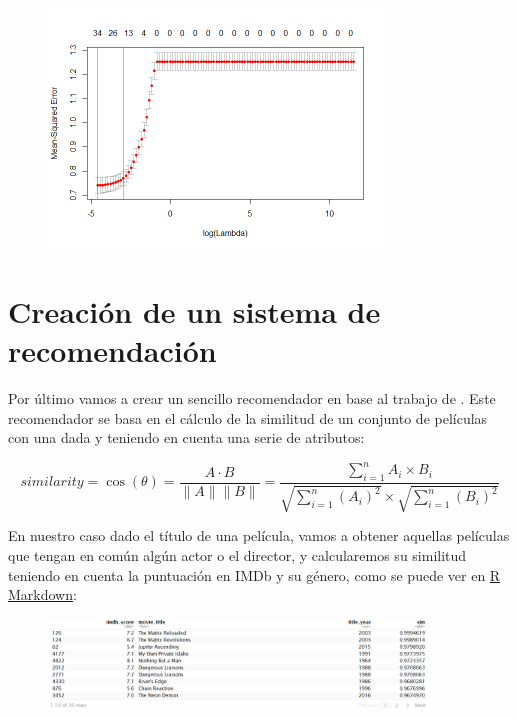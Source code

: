 \documentclass{article}
\begin{document}
\begin{figure}[h]
\centering
\includegraphics[width=3.5in,clip,keepaspectratio]{./model_supervised_files/figure-markdown_github/unnamed-chunk-7-1}
\end{figure}

\clearpage

\section{Creación de un sistema de recomendación}

Por último vamos a crear un sencillo recomendador en base al trabajo de \cite{recommender}. Este recomendador se basa en el cálculo de la similitud de un conjunto de películas con una dada y teniendo en cuenta una serie de atributos:

\begin{equation}
similarity = \cos(\theta) = \frac{A \cdot B}{\parallel A \parallel \parallel B \parallel} = \frac{\sum_{i=1}^{n} A_{i} \times B_{i}}{\sqrt{\sum_{i=1}^{n} (A_{i})^{2}} \times \sqrt{\sum_{i=1}^{n} (B_{i})^{2}}}
\end{equation}

En nuestro caso dado el título de una película, vamos a obtener aquellas películas que tengan en común algún actor o el director, y calcularemos su similitud teniendo en cuenta la puntuación en IMDb y su género, como se puede ver en \href{https://github.com/pozueco/proyecto_fin_de_master/blob/master/recommender.md}{R Markdown}:

\begin{figure}[h]
\centering
\includegraphics[width=4in,clip,keepaspectratio]{./images_latex/recommender1}
\end{figure}
\end{document}
